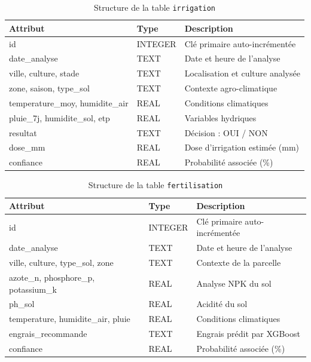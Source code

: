 \begin{table}[H]
	\centering
	\caption{Structure de la table \texttt{irrigation}}
	\label{tab:table_irr}
	\small
	\begin{tabularx}{\textwidth}{llX}
		\toprule
		\textbf{Attribut} & \textbf{Type} & \textbf{Description} \\
		\midrule
		id             & INTEGER & Clé primaire auto-incrémentée \\
		date\_analyse  & TEXT    & Date et heure de l'analyse \\
		ville, culture, stade & TEXT & Localisation et culture analysée \\
		zone, saison, type\_sol & TEXT & Contexte agro-climatique \\
		temperature\_moy, humidite\_air & REAL & Conditions climatiques \\
		pluie\_7j, humidite\_sol, etp   & REAL & Variables hydriques \\
		resultat       & TEXT    & Décision : OUI / NON \\
		dose\_mm       & REAL    & Dose d'irrigation estimée (mm) \\
		confiance      & REAL    & Probabilité associée (\%) \\
		\bottomrule
	\end{tabularx}
\end{table}

\begin{table}[H]
	\centering
	\caption{Structure de la table \texttt{fertilisation}}
	\label{tab:table_fert}
	\small
	\begin{tabularx}{\textwidth}{llX}
		\toprule
		\textbf{Attribut} & \textbf{Type} & \textbf{Description} \\
		\midrule
		id             & INTEGER & Clé primaire auto-incrémentée \\
		date\_analyse  & TEXT    & Date et heure de l'analyse \\
		ville, culture, type\_sol, zone & TEXT & Contexte de la parcelle \\
		azote\_n, phosphore\_p, potassium\_k & REAL & Analyse NPK du sol \\
		ph\_sol        & REAL    & Acidité du sol \\
		temperature, humidite\_air, pluie & REAL & Conditions climatiques \\
		engrais\_recommande & TEXT & Engrais prédit par XGBoost \\
		confiance      & REAL    & Probabilité associée (\%) \\
		\bottomrule
	\end{tabularx}
\end{table}

